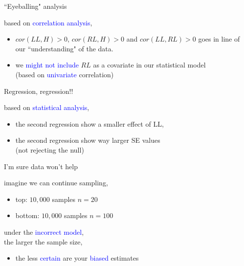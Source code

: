 %
%
\begin{lhframe}[rhgraphic={\texttt{[image: fork4\_panel.pdf]}}]
	{``Eyeballing" analysis}
	
	based on \textcolor{blue}{correlation analysis},
	\begin{itemize}
		\item $cor(LL, H)>0$, $cor(RL, H)>0$ and $cor(LL, RL)>0$ goes in line of our ``understanding" of the data.
		\item we \textcolor{blue}{might not include} $RL$ as a covariate in our statistical model \\
		{\small (based on \textcolor{blue}{univariate} correlation)} 
	\end{itemize}
\end{lhframe}
%
%
\begin{lhframe}[rhgraphic={\texttt{[image: fork4\_reg.png]}}]
	{Regression, regression!!}
	
	based on \textcolor{blue}{statistical analysis},
	\begin{itemize}
		\item the second regression show a smaller effect of LL,
		\item the second regression show way larger SE values \\
		{\small (not rejecting the null)}
	\end{itemize}
\end{lhframe}
%
%
\begin{lhframe}[rhgraphic={\texttt{[image: fork4\_samplesize.pdf]}}]
	{I'm sure data won't help}
	
	imagine we can continue sampling,
	\begin{itemize}
		\item top: $10,000$ samples $n=20$
		\item bottom: $10,000$ samples $n=100$
	\end{itemize}
	
	under the \textcolor{blue}{incorrect model}, \\
	the larger the sample size,
	\begin{itemize}
		\item the less \textcolor{blue}{certain} are your \textcolor{blue}{biased} estimates
	\end{itemize}
\end{lhframe}
%
%
